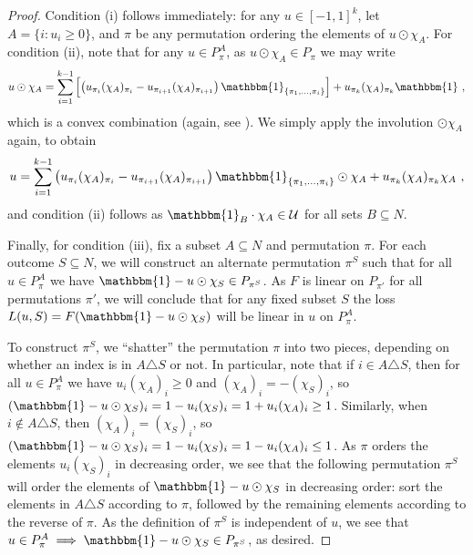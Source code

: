 \documentclass[12pt]{article}
\newcommand{\Comments}{1}
\newcommand{\mytodo}[2]{\ifnum\Comments=1%
  \todo[linecolor=#1!80!black,backgroundcolor=#1,bordercolor=#1!80!black]{#2}\fi}
\newcommand{\jessiet}[1]{\mytodo{teal!20!white}{JF: #1}}
\newcommand{\U}{\mathcal{U}}
\newcommand{\ones}{\mathbbm{1}}
\begin{document}
\begin{proof}
	Condition (i) follows immediately: for any $u\in[-1,1]^k$, let $A = \{i:u_i\geq 0\}$, and $\pi$ be any permutation ordering the elements of $u \odot \chi_A$.
	For condition (ii), note that for any $u\in P^A_\pi$, as $u\odot \chi_A \in P_\pi$ we may write
	\begin{equation}
	\label{eq:udot-conv}
	u \odot \chi_A = \sum_{i=1}^{k-1} \left[ \left( u_{\pi_i} (\chi_A)_{\pi_i} - u_{\pi_{i+1}} (\chi_A)_{\pi_{i+1}} \right) \ones_{\{\pi_1,\ldots,\pi_i\}} \right] + u_{\pi_k} (\chi_A)_{\pi_k} \ones
	~,
	\end{equation}
	which is a convex combination (again, see \citet[pg.\ 167]{bach2013learning}).
	We simply apply the involution $\odot\chi_A$ again, to obtain
	\begin{equation}
	\label{eq:udot-conv}
	u = \sum_{i=1}^{k-1} \left( u_{\pi_i} (\chi_A)_{\pi_i} - u_{\pi_{i+1}} (\chi_A)_{\pi_{i+1}} \right) \ones_{\{\pi_1,\ldots,\pi_i\}}\odot \chi_A + u_{\pi_k} (\chi_A)_{\pi_k} \chi_A
	~,
	\end{equation}
	and condition (ii) follows as $\ones_B \cdot \chi_A \in \U$ for all sets $B\subseteq N$.
	
	Finally, for condition (iii), fix a subset $A\subseteq N$ and permutation $\pi$.
	For each outcome $S\subseteq N$, we will construct an alternate permutation $\pi^S$ such that for all $u\in P^A_\pi$ we have $\ones - u\odot\chi_S \in P_{\pi^S}$.
	As $F$ is linear on $P_{\pi'}$ for all permutations $\pi'$, we will conclude that for any fixed subset $S$ the loss $L(u,S) = F(\ones - u\odot\chi_S)$ will be linear in $u$ on $P^A_\pi$.
	
	To construct $\pi^S$, we ``shatter'' the permutation $\pi$ into two pieces, depending on whether an index is in $A\triangle S$ or not.
	In particular, note that if $i\in A\triangle S$, then for all $u\in P^A_\pi$ we have $u_i(\chi_A)_i \geq 0$ and $(\chi_A)_i = -(\chi_S)_i$, so $(\ones - u\odot\chi_S)_i = 1 - u_i(\chi_S)_i = 1 + u_i(\chi_A)_i \geq 1$.
	Similarly, when $i\notin A\triangle S$, then $(\chi_A)_i = (\chi_S)_i$, so $(\ones - u\odot\chi_S)_i = 1 - u_i(\chi_S)_i = 1 - u_i(\chi_A)_i \leq 1$.
	As $\pi$ orders the elements $u_i(\chi_S)_i$ in decreasing order, we see that the following permutation $\pi^S$ will order the elements of $\ones - u\odot\chi_S$ in decreasing order: sort the elements in $A\triangle S$ according to $\pi$, followed by the remaining elements according to the reverse of $\pi$.
	As the definition of $\pi^S$ is independent of $u$, we see that $u\in P^A_\pi \implies \ones - u\odot\chi_S \in P_{\pi^S}$, as desired.
\end{proof}
\end{document}
